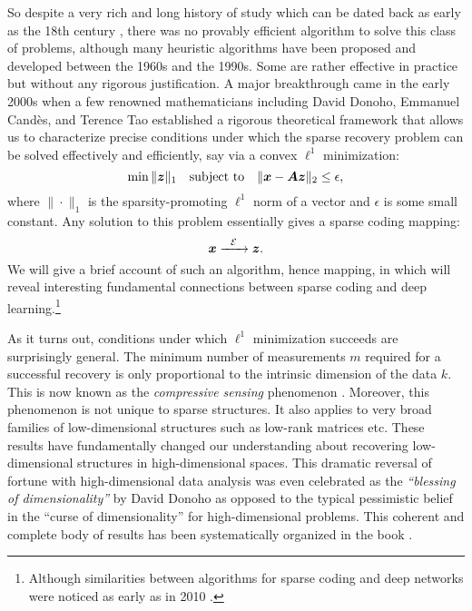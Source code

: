 \documentclass[../../book-main.tex]{subfiles}
\begin{document}
So despite a very rich and long history of study which can be dated back as early as  the 18th century \cite{Boscovichca1750}, there was no provably efficient algorithm to solve this class of problems, although many heuristic algorithms have been proposed and developed between the 1960s and the 1990s. Some are rather effective in practice but without any rigorous justification. A major breakthrough came in the early 2000s when a few renowned mathematicians including David Donoho, Emmanuel Cand\`{e}s, and Terence Tao \cite{donoho2005neighborly,Candes2005,CandesE2005-IT} established a rigorous theoretical framework that allows us to characterize precise conditions under which the sparse recovery problem can be solved effectively and efficiently, say via a convex $\ell^1$ minimization:
\begin{equation}
    \min \|\bm{z}\|_1 \quad \mbox{subject to} \quad \| \bm{x} - \boldsymbol{A}\bm{z}\|_2 \le \epsilon,
\end{equation}
where $\|\cdot \|_1$ is the sparsity-promoting $\ell^1$ norm of a vector and $\epsilon$ is some small constant. Any solution to this problem essentially gives a sparse coding mapping:
\begin{equation}
    \bm{x}   \xrightarrow{\hspace{2mm} \mathcal{E} \hspace{2mm}}  \bm{z}.
       \label{eqn:decoding-sparse}
\end{equation}
We will give a brief account of such an algorithm, hence mapping, in  which will reveal interesting fundamental connections between sparse coding and deep learning.\footnote{Although similarities between algorithms for sparse coding and deep networks were noticed as early as in 2010 \cite{gregor2010learning}.}

As it turns out, conditions under which $\ell^1$ minimization succeeds are surprisingly general. The minimum number of measurements $m$ required for a successful recovery is only proportional to the intrinsic dimension of the data $k$. This is now known as the {\em compressive sensing} phenomenon \cite{CandesE2006-ICM}. Moreover, this phenomenon is not unique to sparse structures. It also applies to very broad families of low-dimensional structures such as low-rank matrices etc. These results have fundamentally changed our understanding about recovering low-dimensional structures in high-dimensional spaces. This dramatic reversal of fortune with high-dimensional data analysis was even celebrated as the {\em ``blessing of dimensionality''} by David Donoho \cite{DonohoD2000} as opposed to the typical pessimistic belief in the ``curse of dimensionality'' for high-dimensional problems. This coherent and complete body of results has been systematically organized in the book \cite{Wright-Ma-2022}. 
\end{document}
